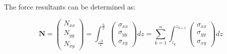 The force resultants can be determined as:

\begin{equation}
\mathbf{N} = 
\begin{pmatrix}
N_{xx} \\
N_{yy} \\
N_{xy} 
\end{pmatrix}
=
{\int_{\frac{-h}{2}}^{\frac{h}{2}}
	\begin{pmatrix}
	\sigma_{xx} \\
	\sigma_{yy} \\
	\sigma_{xy} 
	\end{pmatrix}}
dz
=
\sum_{k=1}^n
\int_{z_k}^{z_{k+1}}
	\begin{pmatrix}
	\sigma_{xx} \\
	\sigma_{yy} \\
	\sigma_{xy} 
	\end{pmatrix}
dz
\label{eqscomp_laminate_constitutive1}
\end{equation}

